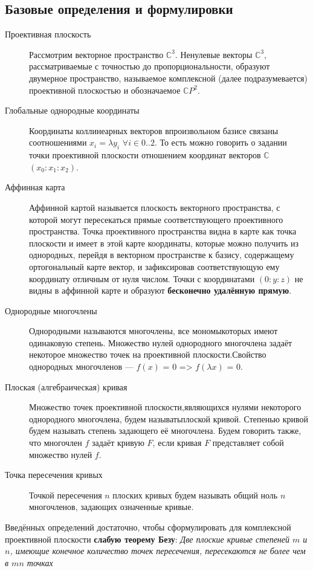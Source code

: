 \documentclass[a4paper, 12pt]{article}
\begin{document}
\subsection{Базовые определения и формулировки}
\begin{description}
\item[Проективная плоскость]
Рассмотрим векторное пространство $\mathbb{C}^3$. Ненулевые векторы $\mathbb{C}^3$, рассматриваемые с точностью до пропорциональности, образуют двумерное пространство, называемое комплексной (далее подразумевается) проективной плоскостью и обозначаемое $\mathbb{C}P^2$.
\item[Глобальные однородные координаты]
Координаты коллинеарных векторов в\newline произвольном базисе связаны соотношениями $x_i = \lambda y_i$ $\forall i \in {0..2}$. То есть можно говорить о задании точки проективной плоскости отношением координат векторов $\mathbb{C}$ $(x_0:x_1:x_2)$.
\item[Аффинная карта]
Аффинной картой называется плоскость векторного пространства, с которой могут пересекаться прямые соответствующего проективного пространства. Точка проективного пространства видна в карте как точка плоскости и имеет в этой карте координаты, которые можно получить из однородных, перейдя в векторном пространстве к базису, содержащему ортогональный карте вектор, и зафиксировав соответствующую ему координату отличным от нуля числом. Точки с координатами $(0:y:z)$ не видны в аффинной карте и образуют \textbf{бесконечно удалённую прямую}.
\end{description}
\begin{description}
\item[Однородные многочлены] Однородными называются многочлены, все мономы\newline которых имеют одинаковую степень. Множество нулей однородного многочлена задаёт некоторое множество точек на проективной плоскости.\newline Свойство однородных многочленов --- $f(x)$ = $0$ => $f(\lambda x)$ = $0$.
\item[Плоская (алгебраическая) кривая]
Множество точек проективной плоскости,\newline являющихся нулями некоторого однородного многочлена, будем называть\newline плоской кривой. Степенью кривой будем называть степень задающего её многочлена. Будем говорить также, что многочлен $f$ задаёт кривую $F$, если кривая $F$ представляет собой множество нулей $f$.
\item[Точка пересечения кривых]
Точкой пересечения $n$ плоских кривых будем называть общий ноль $n$ многочленов, задающих означенные кривые.
\end{description}
Введённых определений достаточно, чтобы сформулировать для комплексной проективной плоскости \textbf{слабую теорему Безу}:
\textit{Две плоские кривые степеней $m$ и $n$, имеющие конечное количество точек пересечения, пересекаются не более чем в $mn$ точках}
\end{document}
